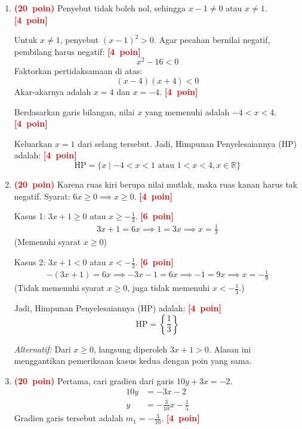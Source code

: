 \documentclass[12pt,a4paper]{article}
\newcommand{\bobot}[1]{\mbox{\textcolor{red}{\textbf{(#1 poin)}}}}
\newcommand{\poin}[1]{\mbox{\textcolor{red}{\textbf{[#1 poin]}}}}
\begin{document}
\begin{enumerate}
  \item \bobot{20}
        Penyebut tidak boleh nol, sehingga $x - 1 \neq 0$ atau $x \neq 1$. \poin{4}

        Untuk $x \neq 1$, penyebut $(x-1)^2 > 0$.
        Agar pecahan bernilai negatif, pembilang harus negatif: \poin{4}
        \[ x^2 - 16 < 0 \]
        Faktorkan pertidaksamaan di atas:
        \[ (x - 4)(x + 4) < 0 \]
        Akar-akarnya adalah $x = 4$ dan $x = -4$. \poin{4}

        Berdasarkan garis bilangan, nilai $x$ yang memenuhi adalah $-4 < x < 4$. \poin{4}

        Keluarkan $x = 1$ dari selang tersebut.
        Jadi, Himpunan Penyelesaiannya (HP) adalah: \poin{4}
        \[ \text{HP} = \{ x \mid -4 < x < 1 \text{ atau } 1 < x < 4, x \in \mathbb{R} \} \]

  \item \bobot{20} Karena ruas kiri berupa nilai mutlak, maka ruas kanan harus tak negatif.
        Syarat: $6x \geq 0 \implies x \geq 0$. \poin{4}

        Kasus 1: $3x + 1 \geq 0$ atau $x \geq -\frac{1}{3}$. \poin{6}
        \begin{align*}
          3x + 1 = 6x \implies
          1 = 3x \implies
          x = \frac{1}{3}
        \end{align*}
        (Memenuhi syarat $x \geq 0$)

        Kasus 2: $3x + 1 < 0$ atau $x < -\frac{1}{3}$. \poin{6}
        \begin{align*}
          -(3x + 1)  = 6x           \implies
          -3x - 1    = 6x           \implies
          -1         = 9x           \implies
          x          = -\frac{1}{9}
        \end{align*}
        (Tidak memenuhi syarat $x \geq 0$, juga tidak memenuhi $x < -\frac{1}{3}$.)

        Jadi, Himpunan Penyelesaiannya (HP) adalah: \poin{4}
        \[ \text{HP} = \left\{ \frac{1}{3} \right\} \]

        \textit{Alternatif:} Dari $x \geq 0$, langsung diperoleh $3x+1>0$.
        Alasan ini menggantikan pemeriksaan kasus kedua dengan poin yang sama.

  \item \bobot{20} Pertama, cari gradien dari garis $10y + 3x = -2$.
        \begin{align*}
          10y & = -3x - 2                      \\
          y   & = -\frac{3}{10}x - \frac{1}{5}
        \end{align*}
        Gradien garis tersebut adalah $m_1 = -\frac{3}{10}$. \poin{4}


\end{enumerate}
\end{document}

